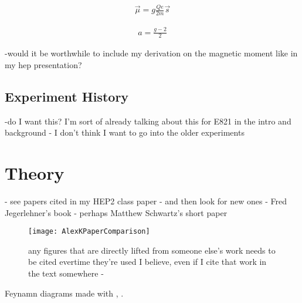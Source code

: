 		\begin{align} \label{eq:magneticmoment}
            \vec{\mu} = g \frac{Qe}{2m} \vec{s}
		\end{align}

		\begin{align} \label{eq:anamoly}
            a = \frac{g-2}{2}
		\end{align}


-would it be worthwhile to include my derivation on the magnetic moment like in my hep presentation?



\subsection{Experiment History}
\label{subsec:ExperimentHistory}

-do I want this? I'm sort of already talking about this for E821 in the intro and background - I don't think I want to go into the older experiments



\section{Theory}
\label{sec:Theory}

- see papers cited in my HEP2 class paper - and then look for new ones
- Fred Jegerlehner's book
- perhaps Matthew Schwartz's short paper 



\begin{figure}[]
	\label{fig:AlexKPaperComparison}
	\centering
	\texttt{[image: AlexKPaperComparison]}
	\caption[AlexKPaperComparison]{any figures that are directly lifted from someone else's work needs to be cited evertime they're used I believe, even if I cite that work in the text somewhere - \cite{Keshavarzi:2018mgv} }
\end{figure}

Feynamn diagrams made with \cite{tikz-feynman}, \cite{tikz-feynhand}.

